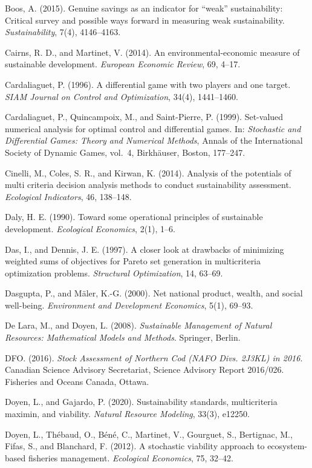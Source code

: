 \documentclass[3p,11pt]{elsarticle}
\begin{document}
Boos, A. (2015). Genuine savings as an indicator for ``weak''
sustainability: Critical survey and possible ways forward in measuring
weak sustainability. \emph{Sustainability}, 7(4), 4146--4163.

Cairns, R. D., and Martinet, V. (2014). An environmental-economic
measure of sustainable development. \emph{European Economic Review}, 69,
4--17.

Cardaliaguet, P. (1996). A differential game with two players and one target. \emph{SIAM Journal on Control and Optimization}, 34(4), 1441--1460.

Cardaliaguet, P., Quincampoix, M., and Saint-Pierre, P. (1999). Set-valued numerical analysis for optimal control and differential games. In: \emph{Stochastic and Differential Games: Theory and Numerical Methods}, Annals of the International Society of Dynamic Games, vol.~4, Birkh\"auser, Boston, 177--247.

Cinelli, M., Coles, S. R., and Kirwan, K. (2014). Analysis of the
potentials of multi criteria decision analysis methods to conduct
sustainability assessment. \emph{Ecological Indicators}, 46, 138--148.

Daly, H. E. (1990). Toward some operational principles of sustainable
development. \emph{Ecological Economics}, 2(1), 1--6.

Das, I., and Dennis, J. E. (1997). A closer look at drawbacks of
minimizing weighted sums of objectives for Pareto set generation in
multicriteria optimization problems. \emph{Structural Optimization}, 14,
63--69.

Dasgupta, P., and M\"aler, K.-G. (2000). Net national product, wealth, and
social well-being. \emph{Environment and Development Economics}, 5(1),
69--93.

De Lara, M., and Doyen, L. (2008). \emph{Sustainable Management of Natural Resources: Mathematical Models and Methods}. Springer, Berlin.

DFO. (2016). \emph{Stock Assessment of Northern Cod (NAFO Divs. 2J3KL) in 2016}. Canadian Science Advisory Secretariat, Science Advisory Report 2016/026. Fisheries and Oceans Canada, Ottawa.

Doyen, L., and Gajardo, P. (2020). Sustainability standards,
multicriteria maximin, and viability. \emph{Natural Resource Modeling},
33(3), e12250.

Doyen, L., Th\'ebaud, O., B\'en\'e, C., Martinet, V., Gourguet, S., Bertignac, M., Fifas, S., and Blanchard, F. (2012). A stochastic viability approach to ecosystem-based fisheries management. \emph{Ecological Economics}, 75, 32--42.
\end{document}
